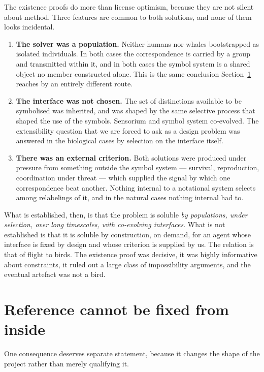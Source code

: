 \noindent
The existence proofs do more than license optimism, because they
are not silent about method.
Three features are common to both solutions, and none of them looks
incidental.

\begin{enumerate}[label=(\roman*),leftmargin=2.2em]
\item \textbf{The solver was a population.}
Neither humans nor whales bootstrapped as isolated individuals.
In both cases the correspondence is carried by a group and
transmitted within it, and in both cases the symbol system is a
shared object no member constructed alone.
This is the same conclusion Section~\ref{sec:social} reaches by an
entirely different route.
\item \textbf{The interface was not chosen.}
The set of distinctions available to be symbolised was inherited,
and was shaped by the same selective process that shaped the use of
the symbols.
Sensorium and symbol system co-evolved.
The extensibility question that we are forced to ask as a design
problem was answered in the biological cases by selection on the
interface itself.
\item \textbf{There was an external criterion.}
Both solutions were produced under pressure from something outside
the symbol system --- survival, reproduction, coordination under
threat --- which supplied the signal by which one correspondence
beat another.
Nothing internal to a notational system selects among relabelings
of it, and in the natural cases nothing internal had to.
\end{enumerate}

\noindent
What is established, then, is that the problem is soluble \emph{by
populations, under selection, over long timescales, with
co-evolving interfaces}.
What is not established is that it is soluble by construction, on
demand, for an agent whose interface is fixed by design and whose
criterion is supplied by us.
The relation is that of flight to birds.
The existence proof was decisive, it was highly informative about
constraints, it ruled out a large class of impossibility arguments,
and the eventual artefact was not a bird.

\section{Reference cannot be fixed from inside}
\label{sec:social}

One consequence deserves separate statement, because it changes the
shape of the project rather than merely qualifying it.


